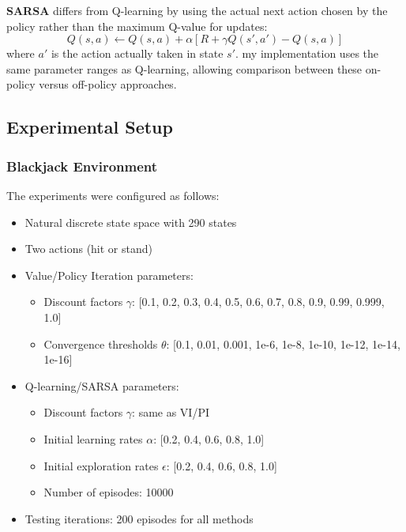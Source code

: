\documentclass[conference]{IEEEtran}
\begin{document}
\textbf{SARSA} differs from Q-learning by using the actual next action chosen by the policy rather than the maximum Q-value for updates:
$$Q(s,a) \leftarrow Q(s,a) + \alpha [R + \gamma Q(s',a') - Q(s,a)]$$
where $a'$ is the action actually taken in state $s'$. my implementation uses the same parameter ranges as Q-learning, allowing comparison between these on-policy versus off-policy approaches.

\subsection{Experimental Setup}
\subsubsection{Blackjack Environment}
The experiments were configured as follows:
\begin{itemize}
    \item Natural discrete state space with 290 states
    \item Two actions (hit or stand)
    \item Value/Policy Iteration parameters:
    \begin{itemize}
        \item Discount factors $\gamma$: [0.1, 0.2, 0.3, 0.4, 0.5, 0.6, 0.7, 0.8, 0.9, 0.99, 0.999, 1.0]
        \item Convergence thresholds $\theta$: [0.1, 0.01, 0.001, 1e-6, 1e-8, 1e-10, 1e-12, 1e-14, 1e-16]
    \end{itemize}
    \item Q-learning/SARSA parameters:
    \begin{itemize}
        \item Discount factors $\gamma$: same as VI/PI
        \item Initial learning rates $\alpha$: [0.2, 0.4, 0.6, 0.8, 1.0]
        \item Initial exploration rates $\epsilon$: [0.2, 0.4, 0.6, 0.8, 1.0]
        \item Number of episodes: 10000
    \end{itemize} 
    \item Testing iterations: 200 episodes for all methods
\end{itemize}
\end{document}
